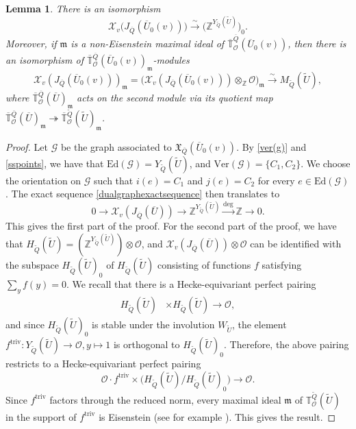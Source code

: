 \documentclass[a4paper, notitlepage, 10pt]{amsart}
\theoremstyle{plain} %
\newtheorem{lemma}[theorem]{Lemma}
\theoremstyle{definition} %
\theoremstyle{remark} %
\numberwithin{equation}{section}
\newcommand{\bbT}{\mathbb T}
\newcommand{\bbZ}{\mathbb Z}
\begin{document}
\begin{lemma}\label{chargroupvnotinQ} There is an isomorphism  $$\mathcal{X}_v\big(J_{\overline{Q}}(\overline{U}_0(v))\big)\xrightarrow{\sim} \big(\bbZ^{Y_{\widetilde{Q}}(\widetilde{U})}\big)_0.$$ Moreover, if $\mathfrak{m}$ is a non-Eisenstein maximal ideal of $\overline
{\bbT}^{\overline{Q}}_{\mathcal{O}}(\overline{U}_0(v))$, then there is an isomorphism of $\overline{\bbT}{}^{\overline{Q}}_{\mathcal{O}}(\overline{U}_0(v))_{\mathfrak{m}}$-modules
    $$ \mathcal{X}_v(J_{\overline{Q}}(\overline{U}_0(v)))_{\mathfrak{m}}=\big(\mathcal{X}_v(J_{\overline{Q}}(\overline{U}_0(v)))\otimes_{\bbZ}\mathcal{O}\big)_{\mathfrak{m}}\xrightarrow{\sim} M_{\widetilde{Q}}(\widetilde{U}), $$
    where $\overline{\bbT}{}^{\overline{Q}}_{\mathcal{O}}(\overline{U})_{\mathfrak{m}}$ acts on the second module via its quotient map $\overline{\bbT}{}^{\overline{Q}}_{\mathcal{O}}(\overline{U})_{\mathfrak{m}}\twoheadrightarrow \overline{\bbT}{}^{\widetilde{Q}}_{\mathcal{O}}(\widetilde{U})_{\mathfrak{m}}$. 
\end{lemma}
\begin{proof}
Let $\mathcal{G}$ be the graph associated to $\mathfrak{X}_{\overline{Q}}(\overline{U}_0(v))$.  By \eqref{ver(g)} and \eqref{sspoints}, we have that $\text{Ed}(\mathcal{G})=Y_{\widetilde{Q}}(\widetilde{U})$, and $\text{Ver}(\mathcal{G})=\{C_1,C_2\}$. We choose the orientation on $\mathcal{G}$ such that $i(e)=C_1$ and $j(e)=C_2$ for every $e\in \text{Ed}(\mathcal{G})$. The exact sequence \eqref{dualgraphexactsequence} then translates to
$$ 0 \to \mathcal{X}_v(J_{\overline{Q}}(\overline{U}))\to \bbZ^{Y_{\widetilde{Q}}(\widetilde{U})}\xrightarrow{\deg} \bbZ \to 0.  $$
This gives the first part of the proof. For the second part of the proof, we have that $H_{\widetilde{Q}}(\widetilde{U})=(\bbZ^{Y_{\widetilde{Q}}(\widetilde{U})})\otimes \mathcal{O}$, and $\mathcal{X}_v(J_{\overline{Q}}(\overline{U}))\otimes \mathcal{O}$ can be identified with the subspace $H_{\widetilde{Q}}(\widetilde{U})_0$ of $H_{\widetilde{Q}}(\widetilde{U})$ consisting of functions $f$ satisfying $\sum_y f(y)=0$.
We recall that there is a Hecke-equivariant perfect pairing
\begin{align*}
    H_{\widetilde{Q}}(\widetilde{U})&\times H_{\widetilde{Q}}(\widetilde{U})\longrightarrow \mathcal{O},
\end{align*}
and since $H_{\widetilde{Q}}(\widetilde{U})_0$ is stable under the involution $W_{\widetilde{U}}$, the element $f^{\text{triv}}\colon Y_{\widetilde{Q}}(\widetilde{U})\to \mathcal{O},y\mapsto 1$ is orthogonal to $H_{\widetilde{Q}}(\widetilde{U})_0$. Therefore, the above pairing restricts to a Hecke-equivariant perfect pairing
$$ \mathcal{O}\cdot f^{\text{triv}} \times \big(H_{\widetilde{Q}}(\widetilde{U})/H_{\widetilde{Q}}(\widetilde{U})_0\big)\longrightarrow \mathcal{O}. $$
Since $f^{\text{triv}}$ factors through the reduced norm, every maximal ideal $\mathfrak{m}$ of $\bbT^{\widetilde{Q}}_{\mathcal{O}}(\widetilde{U})$ in the support of $f^{\text{triv}}$ is Eisenstein (see for example \cite[proof of lemma 3.1]{Tay06}). This gives the result.
\end{proof}
\end{document}
